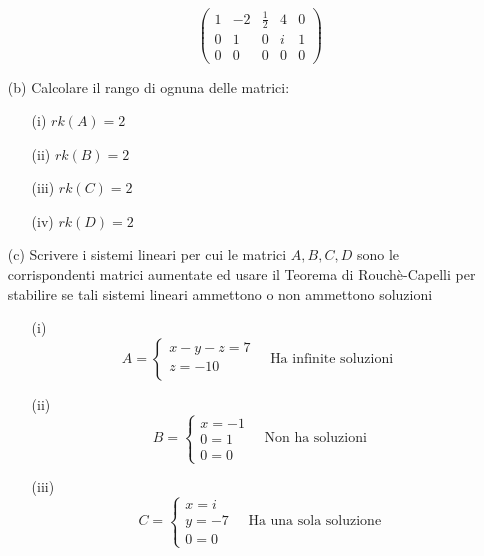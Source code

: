 \documentclass[a4paper]{article}
\theoremstyle{break}
\theoremstyle{break}
\theoremstyle{break}
\theoremstyle{break}
\begin{document}
\begin{enumerate}
\begin{enumerate}
\[\begin{pmatrix}
				            1 & -2 & \frac{1}{2} & 4 & 0 \\
				            0 & 1  & 0           & i & 1 \\
				            0 & 0  & 0           & 0 & 0
			            \end{pmatrix}
		            \]
	      \end{enumerate}
	\item[(b)] Calcolare il rango di ognuna delle matrici:
	      \begin{enumerate}
		      \item[(i)] \( rk(A) = 2 \)
		      \item[(ii)] \( rk(B) = 2 \)
		      \item[(iii)] \( rk(C) = 2 \)
		      \item[(iv)] \( rk(D) = 2 \)
	      \end{enumerate}
	\item[(c)] Scrivere i sistemi lineari per cui le matrici \( A,B,C,D \) sono le
	      corrispondenti matrici aumentate ed usare il Teorema di Rouchè-Capelli per
	      stabilire se tali sistemi lineari ammettono o non ammettono soluzioni
	      \begin{enumerate}
		      \item[(i)]
		            \[
			            A = \begin{cases}
				            x - y - z = 7 \\
				            z = -10       \\
			            \end{cases}
			            \quad
			            \text{Ha infinite soluzioni
			            }
		            \]
		      \item[(ii)]
		            \[
			            B = \begin{cases}
				            x = -1 \\
				            0 = 1  \\
				            0 = 0
			            \end{cases}
			            \quad
			            \text{Non ha soluzioni}
		            \]
		      \item[(iii)]
		            \[
			            C = \begin{cases}
				            x = i  \\
				            y = -7 \\
				            0 = 0
			            \end{cases}
			            \quad
			            \text{Ha una sola soluzione}
		            \]



\end{enumerate}
\end{enumerate}
\end{document}
